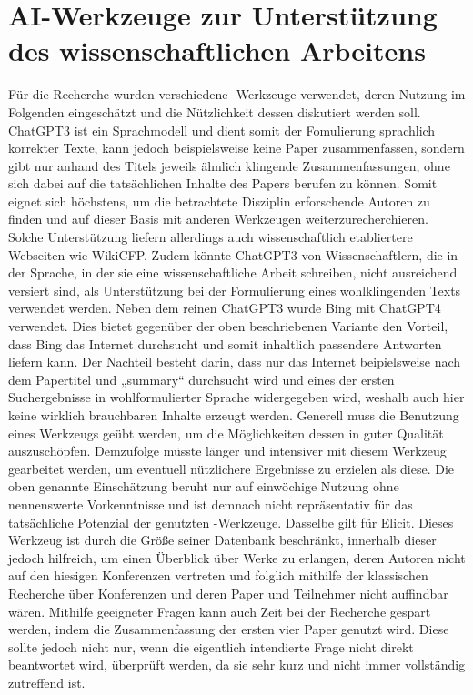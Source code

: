 \documentclass[12pt]{report}
\begin{document}

\chapter{AI-Werkzeuge zur Unterstützung des wissenschaftlichen Arbeitens}
Für die Recherche wurden verschiedene -Werkzeuge verwendet, deren Nutzung im Folgenden eingeschätzt und die Nützlichkeit dessen diskutiert werden soll. 
ChatGPT3 ist ein Sprachmodell und dient somit der Fomulierung sprachlich korrekter Texte, kann jedoch beispielsweise keine Paper zusammenfassen, sondern gibt nur anhand des Titels jeweils ähnlich klingende Zusammenfassungen, ohne sich dabei auf die tatsächlichen Inhalte des Papers berufen zu können. Somit eignet sich höchstens, um die betrachtete Disziplin erforschende Autoren zu finden und auf dieser Basis mit anderen Werkzeugen weiterzurecherchieren. Solche Unterstützung liefern allerdings auch wissenschaftlich
etabliertere Webseiten wie WikiCFP. Zudem könnte ChatGPT3 von Wissenschaftlern, die in der Sprache, in der sie eine wissenschaftliche Arbeit schreiben, nicht ausreichend versiert sind, als Unterstützung bei der Formulierung eines wohlklingenden Texts verwendet werden.
Neben dem reinen ChatGPT3 wurde Bing mit ChatGPT4 verwendet. Dies bietet gegenüber der oben beschriebenen Variante den Vorteil, dass Bing das Internet durchsucht und somit inhaltlich passendere Antworten liefern kann. Der Nachteil besteht darin, dass nur das Internet beipielsweise nach dem Papertitel und „summary“ durchsucht wird und eines der ersten Suchergebnisse in wohlformulierter Sprache widergegeben wird, weshalb auch hier keine wirklich brauchbaren Inhalte erzeugt werden.
Generell muss die Benutzung eines Werkzeugs geübt werden, um die Möglichkeiten dessen in guter Qualität auszuschöpfen. Demzufolge  müsste länger und intensiver mit diesem Werkzeug gearbeitet werden, um eventuell nützlichere Ergebnisse zu erzielen als diese. Die oben genannte Einschätzung beruht nur auf einwöchige Nutzung ohne nennenswerte Vorkenntnisse und ist demnach nicht repräsentativ für das tatsächliche Potenzial der genutzten -Werkzeuge.
Dasselbe gilt für Elicit. Dieses Werkzeug ist durch die Größe seiner Datenbank beschränkt, innerhalb dieser jedoch hilfreich, um einen Überblick über Werke zu erlangen, deren Autoren nicht auf den hiesigen Konferenzen vertreten und folglich mithilfe der klassischen Recherche über Konferenzen und deren Paper und Teilnehmer nicht auffindbar wären. Mithilfe geeigneter Fragen kann auch Zeit bei der Recherche gespart werden, indem die Zusammenfassung der ersten vier Paper genutzt wird. Diese sollte jedoch nicht nur, wenn die eigentlich intendierte Frage nicht direkt beantwortet wird, überprüft werden, da sie sehr kurz und nicht immer vollständig zutreffend ist.



\end{document}
